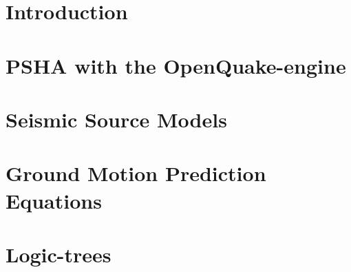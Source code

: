 \documentclass[11pt,fleqn]{book} %
\begin{document}
\chapter{Introduction}


\chapter{PSHA with the OpenQuake-engine}


\chapter{Seismic Source Models}
\label{chap:ssm}


\chapter{Ground Motion Prediction Equations}
\label{chap:gmpes}


\chapter{Logic-trees}


%
\end{document}
